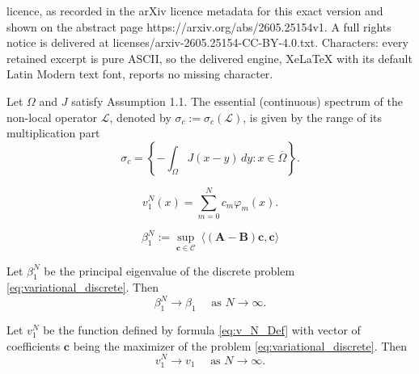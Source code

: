 \documentclass[10pt,a4paper]{amsart}
\begin{document}
licence, as recorded in the arXiv licence metadata for this exact version and shown on the abstract page https://arxiv.org/abs/2605.25154v1. A full rights notice is delivered at licenses/arxiv-2605.25154-CC-BY-4.0.txt. Characters: every retained excerpt is pure ASCII, so the delivered engine, XeLaTeX with its default Latin Modern text font, reports no missing character.
\begin{thm}
    \label{thm:contninous_spectrum}
    Let $\Omega$ and $J$ satisfy Assumption 1.1. The essential (continuous) spectrum of the non-local operator $\mathcal{L}$, denoted by $\sigma_c := \sigma_c(\mathcal{L})$, is given by the range of its multiplication part
    \begin{equation}
        \sigma_c = \left\{ -\int_\Omega J(x-y) \,dy : x \in \overline{\Omega} \right\}.
    \end{equation}
\end{thm}

    \begin{equation}
        \label{eq:v_N_Def}
        v_1^N(x) = \sum_{m=0}^N c_m \varphi_m(x).
    \end{equation}

    \begin{equation}
        \label{eq:variational_discrete}
        \beta_1^N := \sup_{\mathbf{c} \in \mathcal{C}} \: \langle (\mathbf{A} - \mathbf{B}) \mathbf{c}, \mathbf{c} \rangle
    \end{equation}

\begin{lem}
    \label{lem:convergence_principal_eigenvalue}
    Let $\beta_1^N$ be the principal eigenvalue of the discrete problem \eqref{eq:variational_discrete}. Then
    \begin{equation*}
        \beta_1^N \rightarrow \beta_1 \quad \text{ as } N \rightarrow \infty.
    \end{equation*}
\end{lem}

\begin{lem}
    \label{lem:convergence_principal_eigenfunction}
    Let $v_1^N$ be the function defined by formula \eqref{eq:v_N_Def} with vector of coefficients $\mathbf{c}$ being the maximizer of the problem \eqref{eq:variational_discrete}. Then 
    \begin{equation*}
        v_1^N \rightarrow v_1 \quad \text{ as } N \rightarrow \infty.
    \end{equation*}
\end{lem}
\end{document}
